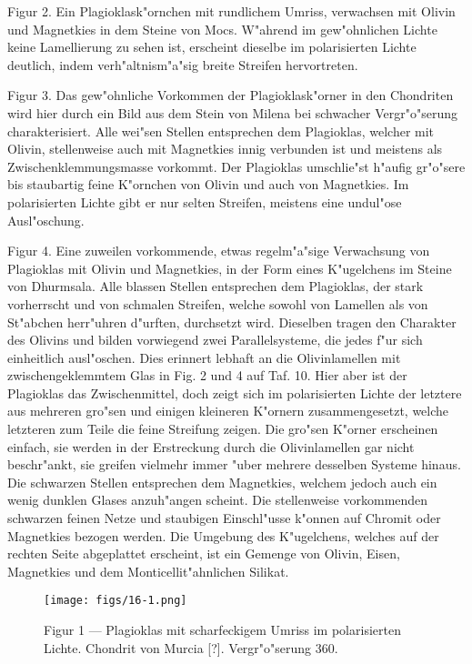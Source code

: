 \documentclass[a4paper, 11pt, oneside, polutonikogreek, german]{article}
\begin{document}
Figur 2. Ein Plagioklask"ornchen mit rundlichem Umriss, verwachsen mit Olivin und Magnetkies in dem Steine von Mocs. W"ahrend im gew"ohnlichen Lichte keine Lamellierung zu sehen ist, erscheint dieselbe im polarisierten Lichte deutlich, indem verh"altnism"a"sig breite Streifen hervortreten.

Figur 3. Das gew"ohnliche Vorkommen der Plagioklask"orner in den Chondriten wird hier durch ein Bild aus dem Stein von Milena bei schwacher Vergr"o"serung charakterisiert. Alle wei"sen Stellen entsprechen dem Plagioklas, welcher mit Olivin, stellenweise auch mit Magnetkies innig verbunden ist und meistens als Zwischenklemmungsmasse vorkommt. Der Plagioklas umschlie"st h"aufig gr"o"sere bis staubartig feine K"ornchen von Olivin und auch von Magnetkies. Im polarisierten Lichte gibt er nur selten Streifen, meistens eine undul"ose Ausl"oschung.

Figur 4. Eine zuweilen vorkommende, etwas regelm"a"sige Verwachsung von Plagioklas mit Olivin und Magnetkies, in der Form eines K"ugelchens im Steine von Dhurmsala. Alle blassen Stellen entsprechen dem Plagioklas, der stark vorherrscht und von schmalen Streifen, welche sowohl von Lamellen als von St"abchen herr"uhren d"urften, durchsetzt wird. Dieselben tragen den Charakter des Olivins und bilden vorwiegend zwei Parallelsysteme, die jedes f"ur sich einheitlich ausl"oschen. Dies erinnert lebhaft an die Olivinlamellen mit zwischengeklemmtem Glas in Fig. 2 und 4 auf Taf. 10. Hier aber ist der Plagioklas das Zwischenmittel, doch zeigt sich im polarisierten Lichte der letztere aus mehreren gro"sen und einigen kleineren K"ornern zusammengesetzt, welche letzteren zum Teile die feine Streifung zeigen. Die gro"sen K"orner erscheinen einfach, sie werden in der Erstreckung durch die Olivinlamellen gar nicht beschr"ankt, sie greifen vielmehr immer "uber mehrere desselben Systeme hinaus. Die schwarzen Stellen entsprechen dem Magnetkies, welchem jedoch auch ein wenig dunklen Glases anzuh"angen scheint. Die stellenweise vorkommenden schwarzen feinen Netze und staubigen Einschl"usse k"onnen auf Chromit oder Magnetkies bezogen werden. Die Umgebung des K"ugelchens, welches auf der rechten Seite abgeplattet erscheint, ist ein Gemenge von Olivin, Eisen, Magnetkies und dem Monticellit"ahnlichen Silikat.
\clearpage

\vspace*{\fill}
\begin{figure}[H]
\centering
\texttt{[image: figs/16-1.png]}
\caption{\small Figur 1 --- Plagioklas mit scharfeckigem Umriss im polarisierten Lichte. Chondrit von Murcia [?]. Vergr"o"serung 360.}
\end{figure}
\vspace*{\fill}
\clearpage
\end{document}
